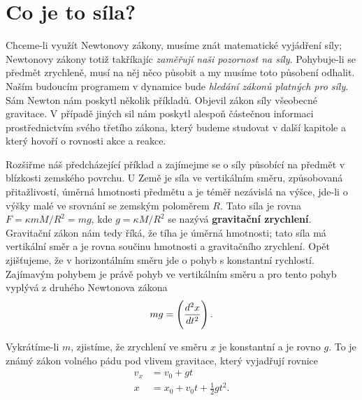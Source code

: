   \section{Co je to síla?}\label{fyz:IchapIXsecIV}
    Chceme-li využít Newtonovy zákony, musíme znát matematické vyjádření síly; Newtonovy zákony 
    totiž takříkajíc \emph{zaměřují naši pozornost na síly}. Pohybuje-li se předmět zrychleně, musí 
    na něj něco působit a my musíme toto působení odhalit. Naším budoucím programem v dynamice bude 
    \emph{hledání zákonů platných pro síly}. Sám Newton nám poskytl několik příkladů. Objevil zákon 
    síly všeobecné gravitace. V případě jiných sil nám poskytl alespoň částečnou informaci 
    prostřednictvím svého třetího zákona, který budeme studovat v další kapitole a který hovoří o 
    rovnosti akce a reakce.
    
    Rozšiřme náš předcházející příklad a zajímejme se o síly působící na předmět v blízkosti 
    zemského povrchu. U Země je síla ve vertikálním směru, způsobovaná přitažlivostí, úměrná 
    hmotnosti předmětu a je téměř nezávislá na výšce, jde-li o výšky malé ve srovnání se zemským 
    poloměrem \(R\). Tato síla je rovna \(F= \kappa mM/R^2 = mg\), kde \(g = \kappa M/R^2\) se 
    nazývá \textbf{gravitační zrychlení}. Gravitační zákon nám tedy říká, že tíha je úměrná 
    hmotnosti; tato síla má vertikální směr a je rovna součinu hmotnosti a gravitačního zrychlení. 
    Opět zjišťujeme, že v horizontálním směru jde o pohyb s konstantní rychlostí. Zajímavým pohybem 
    je právě pohyb ve vertikálním směru a pro tento pohyb vyplývá z druhého Newtonova zákona
    \begin{equation}\label{fyz:eq126}
      mg=\left(\dfrac{d^2 x}{d t^2}\right).
    \end{equation}
    

    Vykrátíme-li \(m\), zjistíme, že zrychlení ve směru \(x\) je konstantní a je rovno \(g\). To je 
    známý zákon volného pádu pod vlivem gravitace, který vyjadřují rovnice
    \begin{align}
      v_x &= v_0 + gt                       \nonumber \\
        x &= x_0 + v_0t + \frac{1}{2}gt^2.  \label{fyz:eq127}
    \end{align}
    
